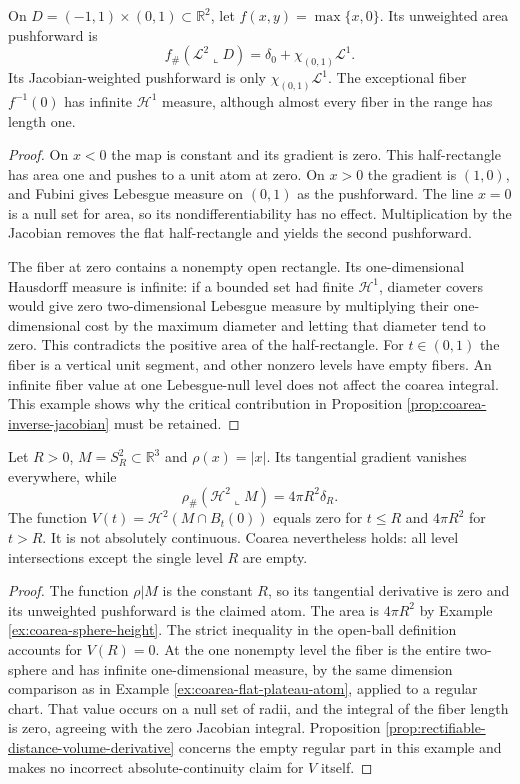 \begin{example}\label{ex:coarea-flat-plateau-atom}
On $D=(-1,1)\times(0,1)\subset\mathbb R^2$, let $f(x,y)=\max\{x,0\}$. Its unweighted area pushforward is
\[
 f_\#(\mathcal L^2\llcorner D)=\delta_0+\chi_{(0,1)}\mathcal L^1.
\]
Its Jacobian-weighted pushforward is only $\chi_{(0,1)}\mathcal L^1$. The exceptional fiber $f^{-1}(0)$ has infinite $\mathcal H^1$ measure, although almost every fiber in the range has length one.
\end{example}
\begin{proof}
On $x<0$ the map is constant and its gradient is zero. This half-rectangle has area one and pushes to a unit atom at zero. On $x>0$ the gradient is $(1,0)$, and Fubini gives Lebesgue measure on $(0,1)$ as the pushforward. The line $x=0$ is a null set for area, so its nondifferentiability has no effect. Multiplication by the Jacobian removes the flat half-rectangle and yields the second pushforward.

The fiber at zero contains a nonempty open rectangle. Its one-dimensional Hausdorff measure is infinite: if a bounded set had finite $\mathcal H^1$, diameter covers would give zero two-dimensional Lebesgue measure by multiplying their one-dimensional cost by the maximum diameter and letting that diameter tend to zero. This contradicts the positive area of the half-rectangle. For $t\in(0,1)$ the fiber is a vertical unit segment, and other nonzero levels have empty fibers. An infinite fiber value at one Lebesgue-null level does not affect the coarea integral. This example shows why the critical contribution in Proposition \ref{prop:coarea-inverse-jacobian} must be retained.
\end{proof}

\begin{example}\label{ex:coarea-spherical-critical-level}
Let $R>0$, $M=S_R^2\subset\mathbb R^3$ and $\rho(x)=|x|$. Its tangential gradient vanishes everywhere, while
\[
 \rho_\#(\mathcal H^2\llcorner M)=4\pi R^2\delta_R.
\]
The function $V(t)=\mathcal H^2(M\cap B_t(0))$ equals zero for $t\leq R$ and $4\pi R^2$ for $t>R$. It is not absolutely continuous. Coarea nevertheless holds: all level intersections except the single level $R$ are empty.
\end{example}
\begin{proof}
The function $\rho|M$ is the constant $R$, so its tangential derivative is zero and its unweighted pushforward is the claimed atom. The area is $4\pi R^2$ by Example \ref{ex:coarea-sphere-height}. The strict inequality in the open-ball definition accounts for $V(R)=0$. At the one nonempty level the fiber is the entire two-sphere and has infinite one-dimensional measure, by the same dimension comparison as in Example \ref{ex:coarea-flat-plateau-atom}, applied to a regular chart. That value occurs on a null set of radii, and the integral of the fiber length is zero, agreeing with the zero Jacobian integral. Proposition \ref{prop:rectifiable-distance-volume-derivative} concerns the empty regular part in this example and makes no incorrect absolute-continuity claim for $V$ itself.
\end{proof}

